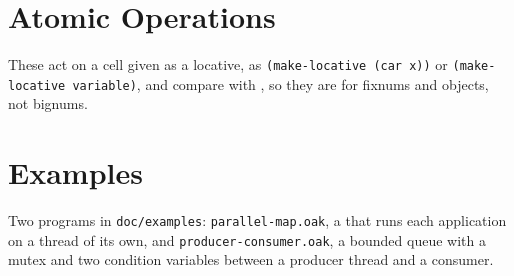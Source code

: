 

\section{Atomic Operations}

These act on a cell given as a locative, as \texttt{(make-locative
(car x))} or \texttt{(make-locative variable)}, and compare with
, so they are for fixnums and objects, not bignums.



\section{Examples}

Two programs in \texttt{doc/examples}: \texttt{parallel-map.oak}, a
 that runs each application on a thread of its own, and
\texttt{producer-consumer.oak}, a bounded queue with a mutex and two
condition variables between a producer thread and a consumer.
